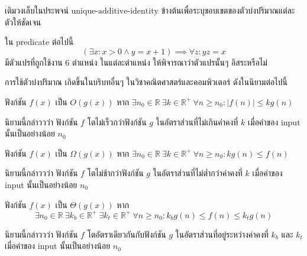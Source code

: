 \begin{exercise}
    เติมวงเล็บในประพจน์ $\textrm{unique-additive-identity}$ ข้างต้นเพื่อระบุขอบเขตของตัวบ่งปริมาณแต่ละตัวให้ชัดเจน
\end{exercise}

\begin{exercise}
ใน predicate ต่อไปนี้ \[(\exists x: x>0\wedge y=x+1)\implies\forall z: yz=x\] มีตัวแปรที่ถูกใช้งาน 6 ตำแหน่ง \enskip ในแต่ละตำแหน่ง ให้พิจารณาว่าตัวแปรนั้นๆ อิสระหรือไม่
\iffalse
\begin{itemize}
\item ในตำแหน่งแรก ตัวแปร $x$ นั้นไม่อิสระ (bound) เนื่องจาก $x$ ตัวนี้มี $\exists$ มาผูกมัดแล้ว
\item ในตำแหน่งที่สอง ตัวแปร $y$ นั้นอิสระ เนื่องจากไม่มีตัวบ่งปริมาณมาผูกมัด $y$
\item ในตำแหน่งที่สาม ตัวแปร $x$ นั้นไม่อิสระ เช่นเดียวกับตำแหน่งที่ 1
\item ในตำแหน่งที่สี่ ตัวแปร $y$ นั้นอิสระ เช่นเดียวกับตำแหน่งที่ 2
\item ในตำแหน่งที่ห้า ตัวแปร $z$ นั้นไม่อิสระ เนื่องจาก $z$ มี $\forall$ มาผูกมัดแล้ว
\item ในตำแหน่งสุดท้าย ตัวแปร $x$ นั้นอิสระ เนื่องจาก $\exists$ ที่ผูกมัด $x$ ก่อนหน้านี้ไม่ได้ครอบคลุมมาถึง $x$ ตัวนี้ \enskip กล่าวอีกนัยหนึ่ง $x$ ตัวนี้อยู่นอกเหนือขอบเขต (scope) ของ $\exists$ ที่ผูกมัด $x$ ตัวอื่นๆ นั่นคือ $x$ ตัวนี้ไม่มีตัวบ่งปริมาณมาผูกมัด
\end{itemize}
\fi
\end{exercise}

การใช้ตัวบ่งปริมาณ เกิดขึ้นในบริบทอื่นๆ ในวิชาคณิตศาสตร์และคอมพิวเตอร์ ดังในนิยามต่อไปนี้
\begin{definition}
ฟังก์ชัน $f(x)$ เป็น $O(g(x))$ หาก $\exists n_0\in\mathbb{R}\ \exists k\in\mathbb{R}^+\ \forall n\geq n_0: |f(n)|\leq kg(n)$
\end{definition}
นิยามนี้กล่าววว่า ฟังก์ชัน $f$ โตไม่เร็วกว่าฟังก์ชัน $g$ ในอัตราส่วนที่ไม่เกินค่าคงที่ $k$ เมื่อค่าของ input นั้นเป็นอย่างน้อย $n_0$

\begin{definition}
ฟังก์ชัน $f(x)$ เป็น $\Omega(g(x))$ หาก $\exists n_0\in\mathbb{R}\ \exists k\in\mathbb{R}^+\ \forall n\geq n_0: kg(n)\leq f(n)$
\end{definition}
นิยามนี้กล่าววว่า ฟังก์ชัน $f$ โตไม่ช้ากว่าฟังก์ชัน $g$ ในอัตราส่วนที่ไม่ต่ำกว่าค่าคงที่ $k$ เมื่อค่าของ input นั้นเป็นอย่างน้อย $n_0$
    
\begin{definition}
ฟังก์ชัน $f(x)$ เป็น $\Theta(g(x))$ หาก \[\exists n_0\in\mathbb{R}\ \exists k_b\in\mathbb{R}^+\ \exists k_t\in\mathbb{R}^+\ \forall n\geq n_0: k_bg(n)\leq f(n)\leq k_tg(n)\]
\end{definition}
นิยามนี้กล่าววว่า ฟังก์ชัน $f$ โตอัตราเดียวกันกับฟังก์ชัน $g$ ในอัตราส่วนที่อยู่ระหว่างค่าคงที่ $k_b$ และ $k_t$ เมื่อค่าของ input นั้นเป็นอย่างน้อย $n_0$

